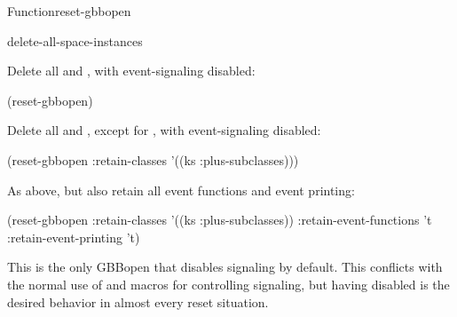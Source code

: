 \documentclass[10pt,twoside,english,pdftex]{article}
\begin{document}
\begin{functiondoc}{Function}{reset-gbbopen}
\begin{alsos}{delete-all-space-instances}
\end{alsos}

\fnexamples
Delete all  and , with
event-signaling disabled:
\begin{example}
  (reset-gbbopen)
\end{example}

Delete all  and , except for
 , with event-signaling disabled:
\begin{example}
  (reset-gbbopen :retain-classes '((ks :plus-subclasses)))
\end{example}

As above, but also retain all event functions and event printing:
\begin{example}
  (reset-gbbopen :retain-classes '((ks :plus-subclasses))
		 :retain-event-functions 't
		 :retain-event-printing 't)
\end{example}

\fnnote 
{}%
%
This is the only GBBopen  that disables 
signaling by default.  This conflicts with the normal use of
\textbf{} and
\textbf{} macros for controlling
 signaling, but having  disabled is the desired
behavior in almost every reset situation.

\end{functiondoc}

\end{document}
